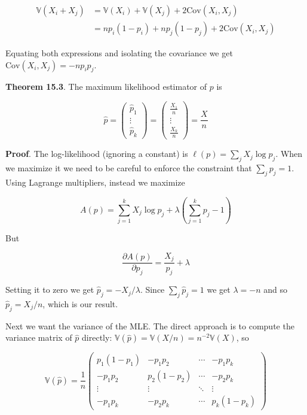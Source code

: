 \begin{align*}
\mathbb{V}(X_{i} + X_{j}) &= \mathbb{V}(X_{i}) + \mathbb{V}(X_{j}) + 2 \text{Cov}(X_{i}, X_{j}) \\
&= np_{i}(1 - p_{i}) + np_{j}(1 - p_{j}) + 2 \text{Cov}(X_{i}, X_{j})
\end{align*}

Equating both expressions and isolating the covariance we get
\(\text{Cov}(X_{i}, X_{j}) = -np_{i}p_{j}\).

\textbf{Theorem 15.3}. The maximum likelihood estimator of \(p\) is

\[\hat{p} 
= \begin{pmatrix} \hat{p}_{1} \\ \vdots \\ \hat{p}_{k} \end{pmatrix}
= \begin{pmatrix} \frac{X_{1}}{n} \\ \vdots \\ \frac{X_{k}}{n} \end{pmatrix}
= \frac{X}{n}
\]

\textbf{Proof}. The log-likelihood (ignoring a constant) is
\(\ell(p) = \sum_{j} X_{j} \log p_{j}\). When we maximize it we need to be
careful to enforce the constraint that \(\sum_{j} p_{j} = 1\). Using
Lagrange multipliers, instead we maximize

\[A(p) = \sum_{j=1}^{k} X_{j} \log p_{j} + \lambda \left( \sum_{j=1}^{k} p_{j} - 1 \right)\]

But

\[\frac{\partial A(p)}{\partial p_{j}} = \frac{X_{j}}{p_{j}} + \lambda\]

Setting it to zero we get \(\hat{p}_{j} = - X_{j} / \lambda\). Since
\(\sum_{j} \hat{p}_{j} = 1\) we get \(\lambda = -n\) and so
\(\hat{p}_{j} = X_{j} / n\), which is our result.

Next we want the variance of the MLE. The direct approach is to compute
the variance matrix of \(\hat{p}\) directly:
\(\mathbb{V}(\hat{p}) = \mathbb{V}(X / n) = n^{-2} \mathbb{V}(X)\), so

\[\mathbb{V}(\hat{p}) = \frac{1}{n} \begin{pmatrix}
p_{1}(1 - p_{1}) & -p_{1}p_{2} & \cdots & -p_{1}p_{k} \\
-p_{1}p_{2} & p_{2}(1 - p_{2}) & \cdots & -p_{2}p_{k} \\
\vdots & \vdots & \ddots & \vdots \\
-p_{1}p_{k} & -p_{2}p_{k} & \cdots & p_{k}(1 - p_{k})
\end{pmatrix}\]

